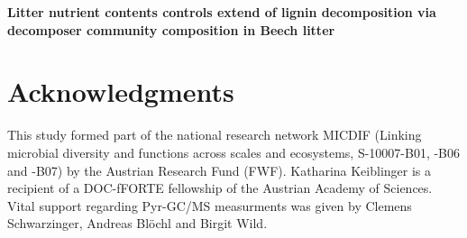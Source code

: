 \documentclass[10pt]{article}
\date{}
\begin{document}


\begin{flushleft}
{\Large
\textbf{Litter nutrient contents controls extend of lignin decomposition via decomposer community composition in Beech litter }
}
\\

\newpage


\newpage%
\pagestyle{empty}





\section*{Acknowledgments}
This study formed part of the national research network MICDIF (Linking microbial diversity and functions across scales and ecosystems, S-10007-B01, -B06 and -B07) by the Austrian Research Fund (FWF). Katharina Keiblinger is a recipient of a DOC-fFORTE fellowship of the Austrian Academy of Sciences. Vital support regarding Pyr-GC/MS measurments was given by Clemens Schwarzinger, Andreas Bl\"{o}chl and Birgit Wild.




\end{flushleft}
\end{document}
